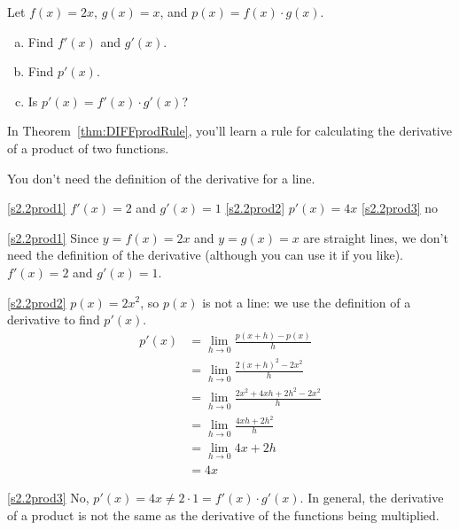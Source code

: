 \begin{question}Let $f(x)=2x$, $g(x)=x$, and $p(x)=f(x) \cdot g(x)$.
\begin{enumerate}[(a)]
\item\label{s2.2prod1} Find $f'(x)$ and $g'(x)$.
\item\label{s2.2prod2} Find $p'(x)$.
\item\label{s2.2prod3} Is $p'(x)=f'(x) \cdot g'(x)$?
\end{enumerate}
In Theorem~\ref*{thm:DIFFprodRule}, you'll learn a rule for calculating the derivative of a product of two functions.
\end{question}
\begin{hint} You don't need the definition of the derivative for a line.\end{hint}
\begin{answer}
\eqref{s2.2prod1} $f'(x)=2$ and $g'(x)=1$
\qquad \eqref{s2.2prod2} $p'(x)=4x$
\qquad \eqref{s2.2prod3} no
\end{answer}
\begin{solution}
\eqref{s2.2prod1}
Since $y=f(x)=2x$ and $y=g(x)=x$ are straight lines, we don't need the definition of the derivative (although you can use it if you like). $f'(x)=2$ and $g'(x)=1$.

\eqref{s2.2prod2} $p(x)=2x^2$, so $p(x)$ is not a line: we use the definition of a derivative to find $p'(x)$.
\begin{align*}
p'(x)&=\lim_{h \rightarrow 0} \frac{p(x+h)-p(x)}{h}\\
&=\lim_{h \rightarrow 0} \frac{2(x+h)^2-2x^2}{h}\\
&=\lim_{h \rightarrow 0} \frac{2x^2+4xh+2h^2-2x^2}{h}\\
&=\lim_{h \rightarrow 0} \frac{4xh+2h^2}{h}\\
&=\lim_{h \rightarrow 0} {4x+2h}\\&=4x
\end{align*}

\eqref{s2.2prod3} No, $p'(x) = 4x \ne 2\cdot 1 = f'(x)\cdot g'(x)$. In general, the derivative of a product is not the same as the derivative of the functions being multiplied.
\end{solution}


